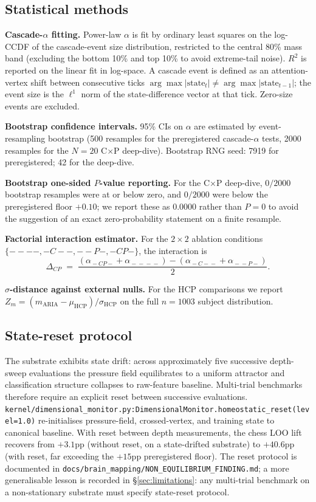 \subsection{Statistical methods}

\textbf{Cascade-$\alpha$ fitting.} Power-law $\alpha$ is fit by
ordinary least squares on the log-CCDF of the cascade-event size
distribution, restricted to the central 80\% mass band (excluding the
bottom 10\% and top 10\% to avoid extreme-tail noise). $R^{2}$ is
reported on the linear fit in log-space. A cascade event is defined
as an attention-vertex shift between consecutive ticks
$\arg\max|\mathrm{state}_{t}|\neq \arg\max|\mathrm{state}_{t-1}|$;
the event size is the $\ell^{1}$ norm of the state-difference vector
at that tick. Zero-size events are excluded.

\textbf{Bootstrap confidence intervals.} 95\% CIs on $\alpha$ are
estimated by event-resampling bootstrap (500 resamples for the
preregistered cascade-$\alpha$ tests, 2000 resamples for the
$N\!=\!20$ C$\times$P deep-dive). Bootstrap RNG seed: 7919 for
preregistered; 42 for the deep-dive.

\textbf{Bootstrap one-sided $P$-value reporting.} For the C$\times$P
deep-dive, $0/2000$ bootstrap resamples were at or below zero, and
$0/2000$ were below the preregistered floor $+0.10$; we report these
as $0.0000$ rather than $P=0$ to avoid the suggestion of an exact
zero-probability statement on a finite resample.

\textbf{Factorial interaction estimator.} For the $2{\times}2$
ablation conditions $\{----, -C--, --P-, -CP-\}$, the interaction is
\[
\Delta_{CP}
\;=\;\frac{(\alpha_{\!-CP\!-}+\alpha_{\!-\!-\!-\!-})
        - (\alpha_{\!-C\!-\!-}+\alpha_{\!-\!-P\!-})}{2}.
\]

\textbf{$\sigma$-distance against external nulls.} For the HCP
comparisons we report
$Z_{m} = (m_{\mathrm{ARIA}} - \mu_{\mathrm{HCP}}) / \sigma_{\mathrm{HCP}}$
on the full $n=1003$ subject distribution.

\subsection{State-reset protocol}

The substrate exhibits state drift: across approximately five
successive depth-sweep evaluations the pressure field equilibrates
to a uniform attractor and classification structure collapses to
raw-feature baseline. Multi-trial benchmarks therefore require an
explicit reset between successive evaluations.
\texttt{kernel/dimensional\_monitor.py:DimensionalMonitor.homeostatic\_reset(level=1.0)}
re-initialises pressure-field, crossed-vertex, and training state to
canonical baseline. With reset between depth measurements, the chess
LOO lift recovers from $+3.1$pp (without reset, on a state-drifted
substrate) to $+40.6$pp (with reset, far exceeding the $+15$pp
preregistered floor). The reset protocol is documented in
\texttt{docs/brain\_mapping/NON\_EQUILIBRIUM\_FINDING.md}; a more
generalisable lesson is recorded in \S\ref{sec:limitations}: any
multi-trial benchmark on a non-stationary substrate must specify
state-reset protocol.


